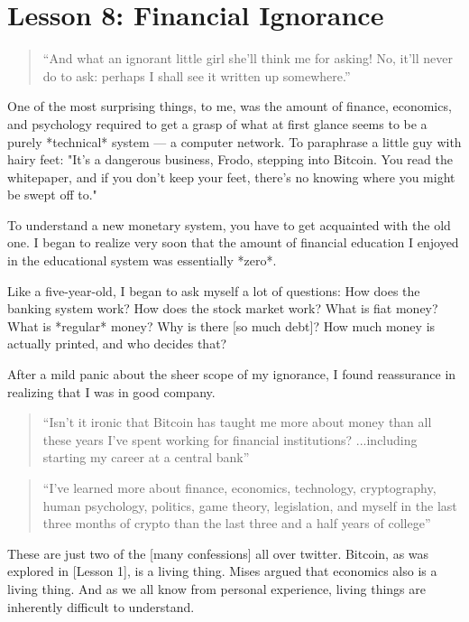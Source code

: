 \chapter{Lesson 8: Financial Ignorance}
\label{les:8}

\blockquote{
``And what an ignorant little girl she'll think me for asking! No, it'll never
do to ask: perhaps I shall see it written up somewhere.''
}

One of the most surprising things, to me, was the amount of finance,
economics, and psychology required to get a grasp of what at first
glance seems to be a purely *technical* system --- a computer network.
To paraphrase a little guy with hairy feet: "It's a dangerous business,
Frodo, stepping into Bitcoin. You read the whitepaper, and if you don't
keep your feet, there's no knowing where you might be swept off to."

To understand a new monetary system, you have to get acquainted with the
old one. I began to realize very soon that the amount of financial
education I enjoyed in the educational system was essentially *zero*.

Like a five-year-old, I began to ask myself a lot of questions: How does
the banking system work? How does the stock market work? What is fiat
money? What is *regular* money? Why is there [so much debt]? How much
money is actually printed, and who decides that?

After a mild panic about the sheer scope of my ignorance, I found
reassurance in realizing that I was in good company.

\begin{quotation}
``Isn't it ironic that Bitcoin has taught me more about money than all
these years I've spent working for financial
institutions? ...including starting my career at a central
bank''
\end{quotation}

\begin{quotation}
``I've learned more about finance, economics, technology, cryptography,
human psychology, politics, game theory, legislation, and myself in
the last three months of crypto than the last three and a half years
of college''
\end{quotation}

These are just two of the [many confessions] all over twitter. Bitcoin,
as was explored in [Lesson 1], is a living thing. Mises argued that
economics also is a living thing. And as we all know from personal
experience, living things are inherently difficult to understand.

